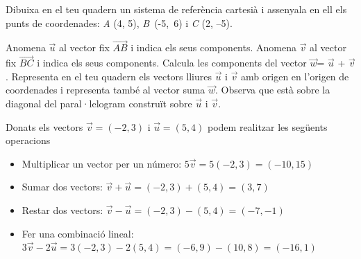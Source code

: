 \begin{mylist}
\exer  Dibuixa en el teu quadern un sistema de referència cartesià i assenyala en ell els punts de coordenades: \textit{A} (4, 5), \textit{B}~(-5,~6) i \textit{C} (2, --5).


\begin{tasks}
	\task  Anomena $\vec u$ al vector fix $\overrightarrow{AB}$ i indica els seus components.
	\task  Anomena $\vec v$ al vector fix $\overrightarrow{BC}$ i indica els seus components.
	\task  Calcula les components del vector $\vec w$= $\vec u$ + $\vec v$.
	\task  Representa en el teu quadern els vectors lliures $\vec u$ i $\vec v$ amb origen en l'origen de coordenades i representa també al vector suma $\vec w$. Observa que està sobre la diagonal del paral·lelogram construït sobre $\vec u$ i $\vec v$.
\end{tasks}

\answers[cols=1]{[$\vec u = (-9,-11)$, $\vec v=(7,-11)$, $\vec w=(-2,-10)$]}

\end{mylist}

\begin{theorybox}
Donats els vectors $\vec v =(-2, 3)$ i $\vec u=(5, 4)$ podem realitzar les següents operacions
\begin{itemize}
	\item  Multiplicar un vector per un número:  $5 \vec v = 5 (-2, 3)=(-10, 15)$ 
	\item Sumar dos vectors:  $\vec v + \vec u = (-2, 3) + (5, 4) = (3, 7)$
	\item Restar dos vectors:  $\vec v - \vec u = (-2, 3) - (5, 4) = (-7, -1)$
	\item Fer una combinació lineal:  $3\vec v - 2\vec u = 3(-2, 3) - 2(5, 4) = (-6, 9) - (10, 8) = (-16, 1)$ 
\end{itemize}
\end{theorybox}

